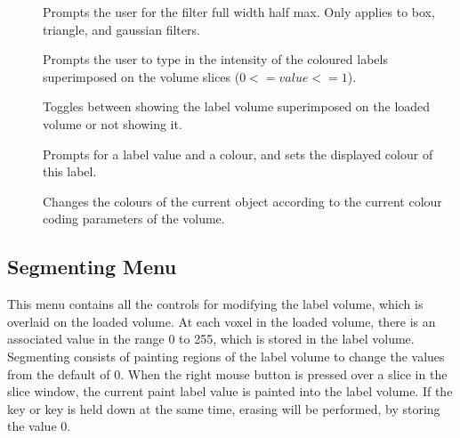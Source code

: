 \begin{description}
\item[]  Prompts the user for
                      the filter full width half max.  Only applies to box,
                      triangle, and gaussian filters.
\item[]  Prompts the user to type in the
                      intensity of the coloured labels superimposed on the 
                      volume slices ($0 <= value <= 1$).
\item[]  Toggles between showing
                      the label volume superimposed on the loaded
                      volume or not showing it.
\item[]  Prompts for a
                      label value and a colour, and sets the displayed
                      colour of this label.
\item[]  Changes the
     colours of the current object according to the current colour
     coding parameters of the volume.
\end{description}

\subsection{Segmenting Menu}

This menu contains all the controls for modifying the label volume,
which is overlaid on the loaded volume.  At each voxel in the loaded
volume, there is an associated value in the range 0 to 255, which is
stored in the label volume.  Segmenting consists of painting regions
of the label volume to change the values from the default of 0.
When the right mouse button is pressed over a slice in the slice
window, the current paint label value is painted into the label
volume.  If the  key or  key is held down
at the same time, erasing will be performed, by storing the value 0.

